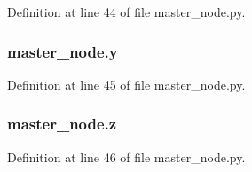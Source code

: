 Definition at line 44 of file master\+\_\+node.\+py.

\subsubsection[{\texorpdfstring{y}{y}}]{\setlength{\rightskip}{0pt plus 5cm}master\+\_\+node.\+y}\hypertarget{namespacemaster__node_ac413c2def2fcd170aa78888c2e13b0ce}{}\label{namespacemaster__node_ac413c2def2fcd170aa78888c2e13b0ce}


Definition at line 45 of file master\+\_\+node.\+py.

\subsubsection[{\texorpdfstring{z}{z}}]{\setlength{\rightskip}{0pt plus 5cm}master\+\_\+node.\+z}\hypertarget{namespacemaster__node_a0aa1d242f836be42c9db48fd53ee63f4}{}\label{namespacemaster__node_a0aa1d242f836be42c9db48fd53ee63f4}


Definition at line 46 of file master\+\_\+node.\+py.

